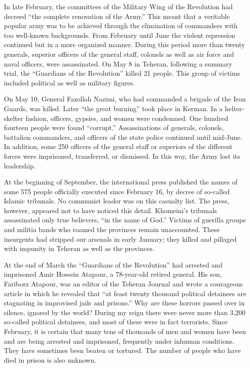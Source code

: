 In late February, the committees of the Military Wing of the Revolution had decreed “the complete renovation of the Army.” This meant that a veritable popular army was to be achieved through the elimination of commanders with too well-known backgrounds. From February until June the violent repression continued but in a more organized manner. During this period more than twenty generals, superior officers of the general staff, colonels as well as air force and naval officers, were assassinated. On May 8 in Teheran, following a summary trial, the “Guardians of the Revolution” killed 21 people. This group of victims included political as well as military figures. 

On May 10, General Fazollah Nazimi, who had commanded a brigade of the Iron Guards, was killed. Later “the great burning” took place in Kerman. In a helter-skelter fashion, officers, gypsies, and women were condemned. One hundred fourteen people were found “corrupt.” Assassinations of generals, colonels, battalion commanders, and officers of the state police continued until mid-June. In addition, some 250 officers of the general staff or superiors of the different forces were imprisoned, transferred, or dismissed. In this way, the Army lost its leadership. 

At the beginning of September, the international press published the names of some 575 people officially executed since February 16, by decree of so-called Islamic tribunals. No communist leader was on this casualty list. The press, however, appeared not to have noticed this detail. Khomeini's tribunals assassinated only true believers, “in the name of God.” Victims of guerilla groups and militia bands who roamed the provinces remain unaccounted. These insurgents had stripped our arsenals in early January; they killed and pillaged with impunity in Teheran as well as the provinces. 

At the end of March the “Guardians of the Revolution” had arrested and imprisoned Amir Hossein Atapour, a 78-year-old retired general. His son, Fariborz Atapour, was an editor of the Teheran Journal and wrote a courageous article in which he revealed that “at feast twenty thousand political detainees are stagnating in improvised jails and prisons.” Why are these horrors passed over in silence, ignored by the world? During my reign there were never more than 3,200 so-called political detainees, and most of these were in fact terrorists. Since February, it is certain that many tens of thousands of men and women have been and are being arrested and imprisoned, frequently under inhuman conditions. They have sometimes been beaten or tortured. The number of people who have died in prison is also unknown. 

